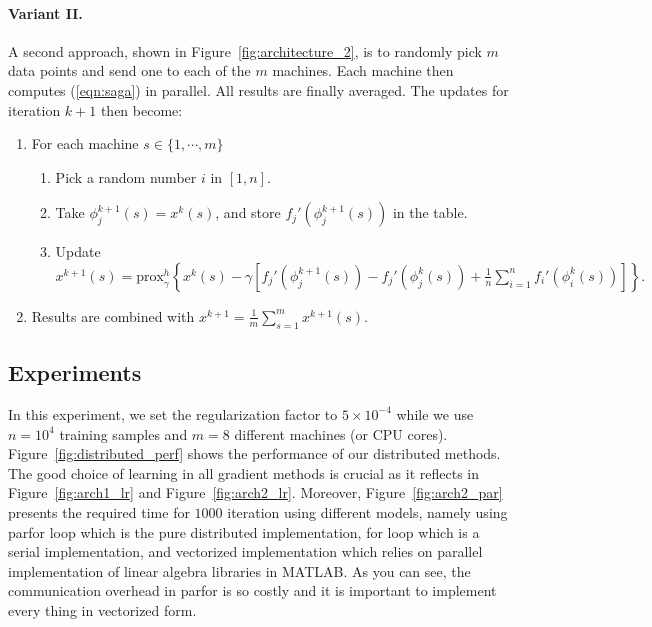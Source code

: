 \documentclass[a4paper,10pt]{article}
\newcommand{\eqnref}[1]{(\ref{eqn:#1})}
\newcommand{\figref}[1]{Figure~\ref{fig:#1}}
\newcommand{\prox}{\textrm{prox}}
\begin{document}
\paragraph{Variant II.} A second approach, shown in \figref{architecture_2},
is to randomly pick $m$ data points and send one to each of the $m$ machines.
Each machine then computes \eqnref{saga} in parallel. All results are finally
averaged. The updates for iteration $k+1$ then become:
\begin{enumerate}	
	\item For each machine $s \in \{ 1, \cdots, m \}$
	\begin{enumerate}
		\item Pick a random number $i$ in $[1, n]$.
		\item Take $\phi_j^{k+1}(s) = x^k(s)$, and store $f_j'(\phi_j^{k+1}(s))$ in the table.
		\item Update $x^{k+1}(s) = \prox_\gamma^h \left\{ x^k(s) - \gamma \left[ f_j'(\phi_j^{k+1}(s)) - f_j'(\phi_j^k(s))
			+ \frac1n \sum_{i=1}^n f_i'(\phi_i^k(s)) \right] \right\}.$
	\end{enumerate}
	\item Results are combined with $ x^{k+1} = \frac{1}{m} \sum_{s=1}^m
		x^{k+1}(s)$.
\end{enumerate}

\subsection{Experiments}

In this experiment, we set the regularization factor to $5\times 10^{-4}$ while
we use $n=10^4$ training samples and $m=8$ different machines (or CPU cores).
\figref{distributed_perf} shows the performance of our distributed methods. The
good choice of learning in all gradient methods is crucial as it reflects in
\figref{arch1_lr} and \figref{arch2_lr}. Moreover, \figref{arch2_par} presents
the required time for $1000$ iteration using different models, namely using
parfor loop which is the pure distributed implementation, for loop which is a
serial implementation, and vectorized implementation which relies on parallel
implementation of linear algebra libraries in MATLAB. As you can see, the
communication overhead in parfor is so costly and it is important to implement
every thing in vectorized form.
\end{document}
